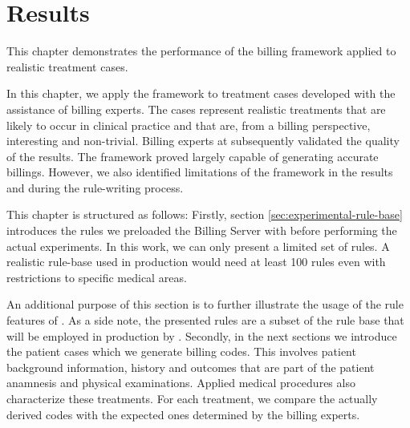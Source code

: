 \chapter{Results}\label{ch:results}
This chapter demonstrates the performance of the billing framework applied to realistic treatment cases.

In this chapter, we apply the framework to treatment cases developed with the assistance of billing experts.
The cases represent realistic treatments that are likely to occur in clinical practice and that are, from a billing perspective, interesting and non-trivial.
Billing experts at \AV subsequently validated the quality of the results.
The framework proved largely capable of generating accurate billings.
However, we also identified limitations of the framework in the results and during the rule-writing process.

This chapter is structured as follows:
Firstly, section \ref{sec:experimental-rule-base} introduces the rules we preloaded the Billing Server with before performing the actual experiments.
In this work, we can only present a limited set of rules.
A realistic rule-base used in production would need at least 100 rules even with restrictions to specific medical areas.

An additional purpose of this section is to further illustrate the usage of the rule features of \RL.
As a side note, the presented rules are a subset of the rule base that will be employed in production by \AV.
Secondly, in the next sections we introduce the patient cases which we generate billing codes.
This involves patient background information, history and outcomes that are part of the patient anamnesis and physical examinations.
Applied medical procedures also characterize these treatments.
For each treatment, we compare the actually derived codes with the expected ones determined by the billing experts.




